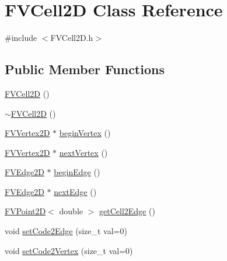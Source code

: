 \hypertarget{classFVCell2D}{
\section{FVCell2D Class Reference}
\label{da/da3/classFVCell2D}
}


{\ttfamily \#include $<$FVCell2D.h$>$}

\subsection*{Public Member Functions}
\begin{DoxyCompactItemize}
\item 
\hyperlink{classFVCell2D_ae1be13799d8d42fcb7aebe7fe88bda3f}{FVCell2D} ()
\item 
\hyperlink{classFVCell2D_abed3be74677406373585410b9e523124}{$\sim$FVCell2D} ()
\item 
\hyperlink{classFVVertex2D}{FVVertex2D} $\ast$ \hyperlink{classFVCell2D_a67415ad3823d1cd8030deaa6c4123f45}{beginVertex} ()
\item 
\hyperlink{classFVVertex2D}{FVVertex2D} $\ast$ \hyperlink{classFVCell2D_a18cc99908c3657e8afe0e7b5feee5c23}{nextVertex} ()
\item 
\hyperlink{classFVEdge2D}{FVEdge2D} $\ast$ \hyperlink{classFVCell2D_a1ae842934bc9c9c5d246f70ff2413057}{beginEdge} ()
\item 
\hyperlink{classFVEdge2D}{FVEdge2D} $\ast$ \hyperlink{classFVCell2D_a3616f047ec627e0ccc4c30343e9b24ef}{nextEdge} ()
\item 
\hyperlink{classFVPoint2D}{FVPoint2D}$<$ double $>$ \hyperlink{classFVCell2D_ab303dcc1c05e3294ff6cb25dcf088fe2}{getCell2Edge} ()
\item 
void \hyperlink{classFVCell2D_a9e25d24a18a62921eff34d38f8b1b896}{setCode2Edge} (size\_\-t val=0)
\item 
void \hyperlink{classFVCell2D_a0a47b3287cfccb79cba1552f3ad1e7b9}{setCode2Vertex} (size\_\-t val=0)
\end{DoxyCompactItemize}

